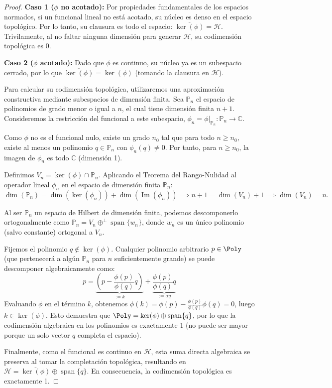 \begin{proof}
	\textbf{Caso 1 ($\phi$ no acotado):} Por propiedades fundamentales de los espacios normados, si un funcional lineal no está acotado, su núcleo es denso en el espacio topológico. Por lo tanto, su clausura es todo el espacio: $\overline{\ker(\phi)} = \mathcal{H}$. Trivilamente, al no faltar ninguna dimensión para generar $\mathcal{H}$, su codimensión topológica es 0.

	\textbf{Caso 2 ($\phi$ acotado):} Dado que $\phi$ es continuo, su núcleo ya es un subespacio cerrado, por lo que $\overline{\ker(\phi)} = \ker(\phi)$ (tomando la clausura en $\mathcal{H}$).

	Para calcular su codimensión topológica, utilizaremos una aproximación constructiva mediante subespacios de dimensión finita. Sea $\mathbb{P}_n$ el espacio de polinomios de grado menor o igual a $n$, el cual tiene dimensión finita $n+1$.
	Consideremos la restricción del funcional a este subespacio, $\phi_n = \phi|_{\mathbb{P}_n} : \mathbb{P}_n \to \mathbb{C}$.

	Como $\phi$ no es el funcional nulo, existe un grado $n_0$ tal que para todo $n \ge n_0$, existe al menos un polinomio $q \in \mathbb{P}_n$ con $\phi_n(q) \neq 0$. Por tanto, para $n \ge n_0$, la imagen de $\phi_n$ es todo $\mathbb{C}$ (dimensión 1).

	Definimos $V_n = \ker(\phi) \cap \mathbb{P}_n$. Aplicando el Teorema del Rango-Nulidad al operador lineal $\phi_n$ en el espacio de dimensión finita $\mathbb{P}_n$:
	$$ \dim(\mathbb{P}_n) = \dim(\ker(\phi_n)) + \dim(\operatorname{Im}(\phi_n)) \implies n+1 = \dim(V_n) + 1 \implies \dim(V_n) = n. $$

	Al ser $\mathbb{P}_n$ un espacio de Hilbert de dimensión finita, podemos descomponerlo ortogonalmente como $\mathbb{P}_n = V_n \oplus^\perp \operatorname{span}\{w_n\}$, donde $w_n$ es un único polinomio (salvo constante) ortogonal a $V_n$.

	Fijemos el polinomio $q \notin \ker(\phi)$. Cualquier polinomio arbitrario $p \in \Poly$ (que pertenecerá a algún $\mathbb{P}_n$ para $n$ suficientemente grande) se puede descomponer algebraicamente como:
	$$ p = \underbrace{\left( p - \frac{\phi(p)}{\phi(q)} q \right)}_{:= k} + \underbrace{\frac{\phi(p)}{\phi(q)} q}_{:= \alpha q} $$
	Evaluando $\phi$ en el término $k$, obtenemos $\phi(k) = \phi(p) - \frac{\phi(p)}{\phi(q)}\phi(q) = 0$, luego $k \in \ker(\phi)$.
	Esto demuestra que $\Poly = \ker(\phi) \oplus \operatorname{span}\{q\}$, por lo que la codimensión algebraica en los polinomios es exactamente 1 (no puede ser mayor porque un solo vector $q$ completa el espacio).

	Finalmente, como el funcional es continuo en $\mathcal{H}$, esta suma directa algebraica se preserva al tomar la completación topológica, resultando en $\mathcal{H} = \overline{\ker(\phi)} \oplus \operatorname{span}\{q\}$. En consecuencia, la codimensión topológica es exactamente 1.
\end{proof}

